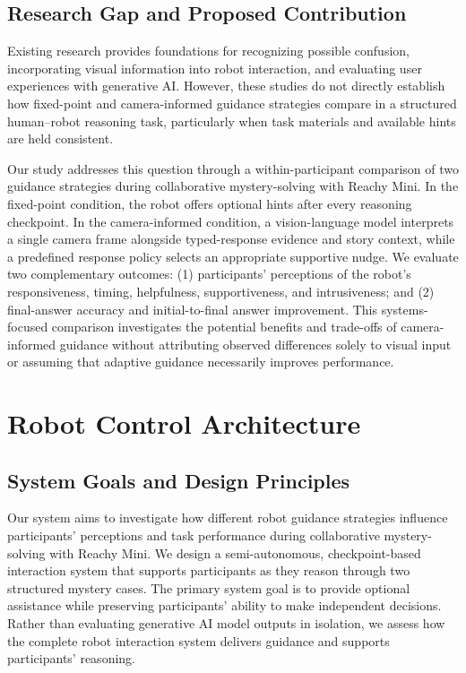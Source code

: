 \documentclass[conference]{IEEEtran}
\begin{document}
\subsection{Research Gap and Proposed Contribution}

Existing research provides foundations for recognizing possible confusion, incorporating visual information into robot interaction, and evaluating user experiences with generative AI. However, these studies do not directly establish how fixed-point and camera-informed guidance strategies compare in a structured human--robot reasoning task, particularly when task materials and available hints are held consistent.

Our study addresses this question through a within-participant comparison of two guidance strategies during collaborative mystery-solving with Reachy Mini. In the fixed-point condition, the robot offers optional hints after every reasoning checkpoint. In the camera-informed condition, a vision-language model interprets a single camera frame alongside typed-response evidence and story context, while a predefined response policy selects an appropriate supportive nudge. We evaluate two complementary outcomes: (1) participants' perceptions of the robot's responsiveness, timing, helpfulness, supportiveness, and intrusiveness; and (2) final-answer accuracy and initial-to-final answer improvement. This systems-focused comparison investigates the potential benefits and trade-offs of camera-informed guidance without attributing observed differences solely to visual input or assuming that adaptive guidance necessarily improves performance.


\section{Robot Control Architecture}

\subsection{System Goals and Design Principles}

Our system aims to investigate how different robot guidance strategies influence participants' perceptions and task performance during collaborative mystery-solving with Reachy Mini. We design a semi-autonomous, checkpoint-based interaction system that supports participants as they reason through two structured mystery cases. The primary system goal is to provide optional assistance while preserving participants' ability to make independent decisions. Rather than evaluating generative AI model outputs in isolation, we assess how the complete robot interaction system delivers guidance and supports participants' reasoning.
\end{document}
